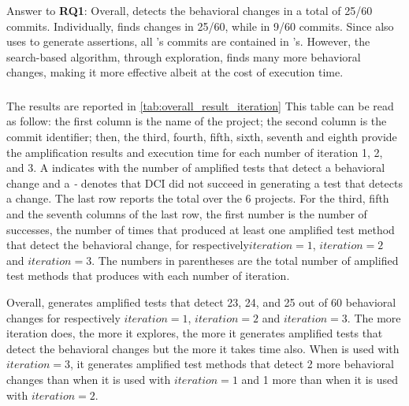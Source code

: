 \begin{mdframed}
Answer to \textbf{RQ1}: Overall, \DCI detects the behavioral changes in a total of 25/60 commits. 
Individually, \DCII finds changes in 25/60, while \DCIA in 9/60 commits.
Since \DCII also uses \aampl to generate assertions, all \DCIA's commits are contained in \DCII's. 
However, the search-based algorithm, through exploration, finds many more behavioral changes, making it more effective albeit at the cost of execution time.
\end{mdframed}


\subsubsection{\rqiteration}
\label{subsubsec:dci:evaluation:rq2}

The results are reported in \autoref{tab:overall_result_iteration}
This table can be read as follow:
the first column is the name of the project;
the second column is the commit identifier;
then, the third, fourth, fifth, sixth, seventh and eighth provide the amplification results and execution time for each number of iteration 1, 2, and 3. 
A \cmark indicates with the number of amplified tests that detect a behavioral change and a \textit{-} denotes that DCI did not succeed in generating a test that detects a change.
The last row reports the total over the 6 projects.
For the third, fifth and the seventh columns of the last row, the first number is the number of successes, \ie the number of times that \DCI produced at least one amplified test method that detect the behavioral change, for respectively$iteration=1$, $iteration=2$ and $iteration=3$.
The numbers in parentheses are the total number of amplified test methods that \DCI produces with each number of iteration.

Overall, \DCII generates amplified tests that detect 23, 24, and 25 out of 60 behavioral changes for respectively $iteration=1$, $iteration=2$ and $iteration=3$.
The more iteration \DCII does, the more it explores, the more it generates amplified tests that detect the behavioral changes but the more it takes time also.
When \DCII is used with $iteration=3$, it generates amplified test methods that detect 2 more behavioral changes than when it is used with $iteration=1$ and 1 more than when it is used with $iteration=2$.

